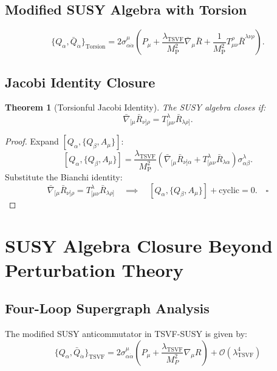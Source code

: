 \documentclass[12pt, onecolumn]{article}
\newtheorem{theorem}{Theorem}[section]
\newcommand{\TSVF}{\lambda_{\text{TSVF}}}
\newcommand{\MP}{M_{\mathrm{P}}}
\theoremstyle{definition}
\numberwithin{equation}{section}
\begin{document}
\begin{appendices}
\subsection{Modified SUSY Algebra with Torsion}\label{sec:susy-algebra}
\begin{equation}\label{eq:susy-torsion}
\{Q_\alpha, \bar{Q}_{\dot{\alpha}}\}_{\text{Torsion}} = 2\sigma^\mu_{\alpha\dot{\alpha}} \left( P_\mu + \frac{\TSVF}{\MP^2} \bar{\nabla}_\mu \bar{R} + \frac{1}{\MP^2} T^\rho_{\mu\nu} \bar{R}^{\lambda\nu\rho} \right).
\end{equation}


\subsection{Jacobi Identity Closure}\label{sec:jacobi}
\begin{theorem}[Torsionful Jacobi Identity]\label{thm:jacobi}
The SUSY algebra closes if:
\[
\bar{\nabla}_{[\mu} \bar{R}_{\nu]\rho} = T^\lambda_{[\mu\nu} \bar{R}_{\lambda\rho]}.
\]
\end{theorem}

\begin{proof}
Expand \( [Q_\alpha, \{Q_\beta, A_\mu\}] \):
\[
[Q_\alpha, \{Q_\beta, A_\mu\}] = \frac{\TSVF}{\MP^2} \left( \bar{\nabla}_{[\mu} \bar{R}_{\nu]\alpha} + T^\lambda_{[\mu\nu} \bar{R}_{\lambda\alpha} \right) \sigma^\lambda_{\alpha\beta}.
\]
Substitute the Bianchi identity:
\[
\bar{\nabla}_{[\mu} \bar{R}_{\nu]\rho} = T^\lambda_{[\mu\nu} \bar{R}_{\lambda\rho]} 
\quad \implies \quad 
[Q_\alpha, \{Q_\beta, A_\mu\}] + \text{cyclic} = 0. \quad \square
\]
\end{proof}

\section{SUSY Algebra Closure Beyond Perturbation Theory}
\label{sec:fourloop}

\subsection{Four-Loop Supergraph Analysis}

The modified SUSY anticommutator in TSVF-SUSY is given by:
\begin{equation}
\{Q_\alpha, \bar{Q}_{\dot{\alpha}}\}_{\text{TSVF}} = 2\sigma^\mu_{\alpha\dot{\alpha}}\left(P_\mu + \frac{\lambda_{\text{TSVF}}}{M_P^2}\nabla_\mu R\right) + \mathcal{O}(\lambda_{\text{TSVF}}^4)
\label{eq:susy-anticommutator}
\end{equation}


\end{appendices}
\end{document}
